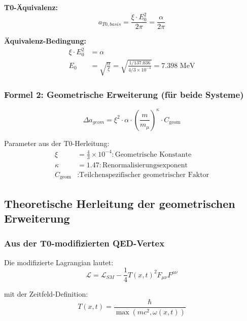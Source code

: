 \documentclass[12pt,a4paper]{article}
\numberwithin{equation}{section}
\newcommand{\xipar}{\xi}
\newcommand{\Cgeom}{C_{\text{geom}}}
\newcommand{\kappaT}{\kappa}
\newcommand{\mmu}{m_{\mu}}
\newcommand{\calL}{\mathcal{L}}
\begin{document}
	\textbf{T0-Äquivalenz:}
	\begin{equation}
		\label{eq:t0_basic}
		a_{T0,basis} = \frac{\xipar \cdot E_0^2}{2\pi} = \frac{\alpha}{2\pi}
	\end{equation}
	
	\textbf{Äquivalenz-Bedingung:}
	\begin{align}
		\xipar \cdot E_0^2 &= \alpha\\
		E_0 &= \sqrt{\frac{\alpha}{\xipar}} = \sqrt{\frac{1/137.036}{4/3 \times 10^{-4}}} = 7.398 \text{ MeV}
	\end{align}
	
	\subsubsection{Formel 2: Geometrische Erweiterung (für beide Systeme)}
	
	\begin{equation}
		\label{eq:geometric_extension}
		\Delta a_{geom} = \xipar^2 \cdot \alpha \cdot \left(\frac{m}{\mmu}\right)^\kappaT \cdot \Cgeom
	\end{equation}
	
	Parameter aus der T0-Herleitung:
	\begin{align}
		\xipar &= \frac{4}{3} \times 10^{-4} : \text{Geometrische Konstante}\\
		\kappaT &= 1.47 : \text{Renormalisierungsexponent}\\
		\Cgeom &: \text{Teilchenspezifischer geometrischer Faktor}
	\end{align}
	
	\subsection{Theoretische Herleitung der geometrischen Erweiterung}
	
	\subsubsection{Aus der T0-modifizierten QED-Vertex}
	
	Die modifizierte Lagrangian lautet:
	\begin{equation}
		\label{eq:modified_lagrangian}
		\calL = \calL_{SM} - \frac{1}{4}T(x,t)^2 F_{\mu\nu} F^{\mu\nu}
	\end{equation}
	
	mit der Zeitfeld-Definition:
	\begin{equation}
		\label{eq:time_field}
		T(x,t) = \frac{\hbar}{\max(mc^2, \omega(x,t))}
	\end{equation}
	
\end{document}
